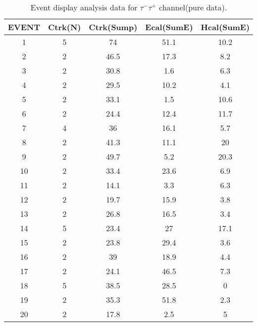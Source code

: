     \begin{table}[h!]
    \centering
    \caption{Event display analysis data for $\tau^-\tau^+$ channel(pure data).}
    \begin{tabular}{ccccc}
    \hline
    EVENT & Ctrk(N) & Ctrk(Sump) & Ecal(SumE) & Hcal(SumE) \\ \hline
    1     & 5       & 74         & 51.1       & 10.2       \\
    2     & 2       & 46.5       & 17.3       & 8.2        \\
    3     & 2       & 30.8       & 1.6        & 6.3        \\
    4     & 2       & 29.5       & 10.2       & 4.1        \\
    5     & 2       & 33.1       & 1.5        & 10.6       \\
    6     & 2       & 24.4       & 12.4       & 11.7       \\
    7     & 4       & 36         & 16.1       & 5.7        \\
    8     & 2       & 41.3       & 11.1       & 20         \\
    9     & 2       & 49.7       & 5.2        & 20.3       \\
    10    & 2       & 33.4       & 23.6       & 6.9        \\
    11    & 2       & 14.1       & 3.3        & 6.3        \\
    12    & 2       & 19.7       & 15.9       & 3.8        \\
    13    & 2       & 26.8       & 16.5       & 3.4        \\
    14    & 5       & 23.4       & 27         & 17.1       \\
    15    & 2       & 23.8       & 29.4       & 3.6        \\
    16    & 2       & 39         & 18.9       & 4.4        \\
    17    & 2       & 24.1       & 46.5       & 7.3        \\
    18    & 5       & 38.5       & 28.5       & 0          \\
    19    & 2       & 35.3       & 51.8       & 2.3        \\
    20    & 2       & 17.8       & 2.5        & 5         \\ \hline
    \end{tabular}
    \label{table:ed-tt}
    \end{table}
    
